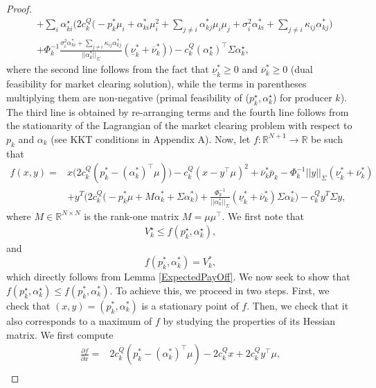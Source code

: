 \documentclass{article}
\begin{document}
\begin{proof}
\begin{align*}
   &+ \sum_i \alpha_{ki}^\star \Big(2c_k^Q\big(- p_k^* \mu_i + \alpha_{ki}^*\mu_i^2 + \sum_{j \ne i} \alpha_{kj}^* \mu_i \mu_j + \sigma_i^2 \alpha_{ki}^* + \sum_{j \ne i} \kappa_{ij} \alpha_{kj}^*\big) \\
    &+ \Phi_k^{-1} \frac{\sigma_i^2 \alpha_{ki}^* + \sum_{j \ne i} \kappa_{ij} \alpha_{kj}^*}{||\alpha_k^*||_\Sigma}(\underline{\nu}_k^* +\overline{\nu}_k^*)\Big) - c_k^Q (\alpha_k^\star)^\top\Sigma \alpha_k^\star,
\end{align*}
where the second line follows from the fact that $\underline{\nu}_k^* \ge 0$ and $\overline{\nu}_k^* \ge 0$ (dual feasibility for market clearing solution), while the terms in parentheses multiplying them are non-negative (primal feasibility of ($p_k^\star, \alpha_k^\star$) for producer $k$). The third line is obtained by re-arranging terms and the fourth line follows from the stationarity of the Lagrangian of the market clearing problem with respect to $p_k$ and $\alpha_k$ (see KKT conditions in Appendix A). Now, let $f:\mathbb{R}^{N+1} \rightarrow \mathbb{R}$ be such that
\begin{align*}
f(x, y) =& x \big(2c_k^Q(p_k^* - (\alpha_k^*)^\top \mu)\big) - c_k^Q(x - y^\top \mu)^2 + \overline{\nu}_k^* \overline{p}_k - \Phi_k^{-1} ||y||_\Sigma (\underline{\nu}_k^* + \overline{\nu}_k^*)\\ 
    &+ y^T \Big(2c_k^Q\big(- p_k^* \mu + M \alpha_k^* + \Sigma \alpha_k^*\big) + \frac{\Phi_k^{-1}}{||\alpha_k^*||_\Sigma}(\underline{\nu}_k^* +\overline{\nu}_k^*) \Sigma \alpha_k^*\Big) - c_k^Q y^T \Sigma y,
\end{align*}
where $M \in \mathbb{R}^{N \times N}$ is the rank-one matrix $M = \mu \mu^\top$.
We first note that
\begin{align*}
V_k^\star \le f(p_k^\star, \alpha_k^\star),
\end{align*} 
and
\begin{equation*}
f(p_k^*, \alpha_k^*) = V_k^*,
\end{equation*}
which directly follows from Lemma \ref{ExpectedPayOff}. We now seek to show that $f(p_k^\star, \alpha_k^\star) \le f(p_k^*, \alpha_k^*)$. To achieve this, we proceed in two steps. First, we check that $(x, y) = (p_k^*, \alpha_k^*)$ is a stationary point of $f$. Then, we check that it also corresponds to a maximum of $f$ by studying the properties of its Hessian matrix. We first compute
\begin{align*}
\frac{\partial f}{\partial x} =& 2c_k^Q(p_k^* - (\alpha_k^*)^\top\mu) - 2 c_k^Q x + 2c_k^Q y^\top \mu,\\

\end{align*}
\end{proof}
\end{document}
